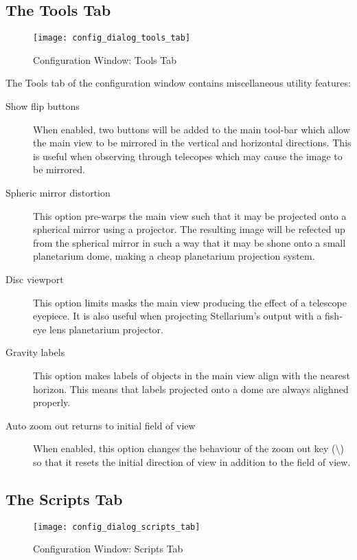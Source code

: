 \subsection{The Tools Tab}
\label{sec:gui:configuration:tools}


\begin{figure}[p]
\centering\texttt{[image: config\_dialog\_tools\_tab]}
\caption{Configuration Window: Tools Tab}
\label{fig:gui:configuration:tools}
\end{figure}


The Tools tab of the configuration window contains miscellaneous utility
features:

\begin{description}
\item[Show flip buttons] When enabled, two buttons will be added to
  the main tool-bar which allow the main view to be mirrored in the
  vertical and horizontal directions. This is useful when observing
  through telecopes which may cause the image to be mirrored.
\item[Spheric mirror distortion] This option pre-warps the main view
  such that it may be projected onto a spherical mirror using a
  projector. The resulting image will be refected up from the spherical
  mirror in such a way that it may be shone onto a small planetarium
  dome, making a cheap planetarium projection system.
\item[Disc viewport] This option limits masks the main view
  producing the effect of a telescope eyepiece. It is also useful when
  projecting Stellarium's output with a fish-eye lens planetarium
  projector.
\item[Gravity labels] This option makes labels of objects in the
  main view align with the nearest horizon. This means that labels
  projected onto a dome are always alighned properly.
\item[Auto zoom out returns to initial field of view] When enabled,
  this option changes the behaviour of the zoom out key
  (\textbackslash{}) so that it resets the initial direction of view in
  addition to the field of view.
\end{description}

\subsection{The Scripts Tab}
\label{sec:gui:scripts}


\begin{figure}[p]
\centering\texttt{[image: config\_dialog\_scripts\_tab]}
\caption{Configuration Window: Scripts Tab}
\label{fig:gui:configuration:scripts}
\end{figure}

